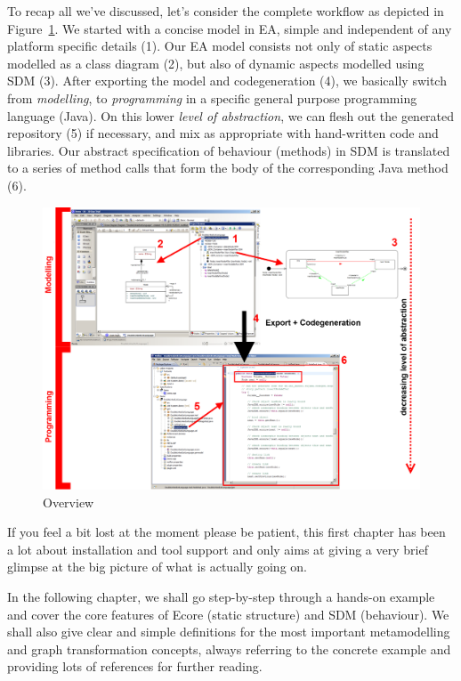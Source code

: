 To recap all we've discussed, let's consider the complete workflow as depicted
in Figure~\ref{fig_Overview}. We started with a concise model in EA, simple and
independent of any platform specific details (1).  Our EA model consists not
only of static aspects modelled as a class diagram (2), but also of dynamic
aspects modelled using SDM (3).  After exporting the model and codegeneration
(4), we basically switch from \emph{modelling}, to \emph{programming} in a
specific general purpose programming language (Java).  On this lower \emph{level
of abstraction}, we can flesh out the generated repository (5) if necessary, and 
mix as appropriate with hand-written code and libraries.  Our abstract specification of 
behaviour (methods) in SDM is translated to a series of method calls that form
the body of the corresponding Java method (6).
\begin{figure}[!h]
	\centering
  \includegraphics[width=1\textwidth]{pics/tafelbild}
	\caption{Overview}
	\label{fig_Overview}
\end{figure}


If you feel a bit lost at the moment please be patient, this first chapter has
been a lot about installation and tool support and only aims at giving a very
brief glimpse at the big picture of what is actually going on.    

In the following chapter, we shall go step-by-step through a hands-on example
and cover the core features of Ecore (static structure) and SDM (behaviour). 
We shall also give clear and simple definitions for the most important
metamodelling and graph transformation concepts, always referring to the
concrete example and providing lots of references for further reading.